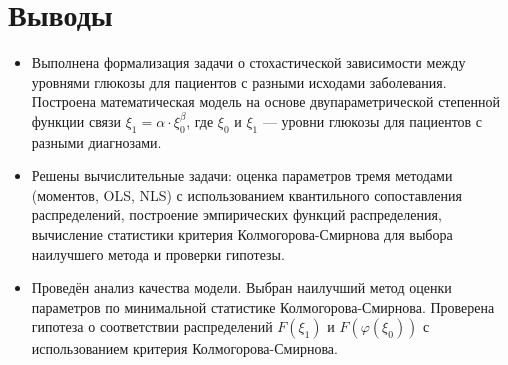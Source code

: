 \documentclass[a4paper, 14pt]{extarticle}
\begin{document}
\section{Выводы}

\begin{itemize}
  \item Выполнена формализация задачи о стохастической зависимости между уровнями глюкозы для пациентов с разными исходами заболевания. Построена математическая модель на основе двупараметрической степенной функции связи $\xi_1 = \alpha \cdot \xi_0^{\beta}$, где $\xi_0$ и $\xi_1$ --- уровни глюкозы для пациентов с разными диагнозами.
  
  \item Решены вычислительные задачи: оценка параметров тремя методами (моментов, OLS, NLS) с использованием квантильного сопоставления распределений, построение эмпирических функций распределения, вычисление статистики критерия Колмогорова-Смирнова для выбора наилучшего метода и проверки гипотезы.
  
  \item Проведён анализ качества модели. Выбран наилучший метод оценки параметров по минимальной статистике Колмогорова-Смирнова. Проверена гипотеза о соответствии распределений $F(\xi_1)$ и $F(\varphi(\xi_0))$ с использованием критерия Колмогорова-Смирнова.
  
  \end{itemize}
\end{document}

